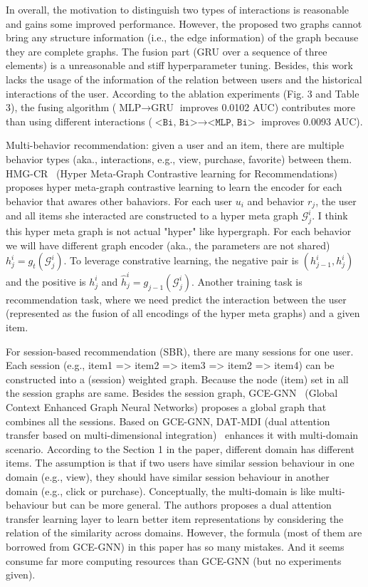 In overall, the motivation to distinguish two types of interactions is reasonable and gains some improved performance.
However, the proposed two graphs cannot bring any structure information (i.e., the edge information) of the graph because they are complete graphs.
The fusion part (GRU over a sequence of three elements) is a unreasonable and stiff hyperparameter tuning.
Besides, this work lacks the usage of the information of the relation between users and the historical interactions of the user.
According to the ablation experiments (Fig. 3 and Table 3), the fusing algorithm ($\text{MLP} \rightarrow \text{GRU}$ improves 0.0102 AUC) contributes more than using different interactions ($\texttt{<Bi, Bi>} \rightarrow \texttt{<MLP, Bi>}$ improves 0.0093 AUC).

Multi-behavior recommendation: given a user and an item, there are multiple behavior types (aka., interactions, e.g., view, purchase, favorite) between them.
HMG-CR~ (Hyper Meta-Graph Contrastive learning for Recommendations) proposes hyper meta-graph contrastive learning to learn the encoder for each behavior that awares other bahaviors.
For each user $u_i$ and behavior $r_j$, the user and all items she interacted are constructed to a hyper meta graph $\mathcal{G}_j^i$.
I think this hyper meta graph is not actual "hyper" like hypergraph.
For each behavior we will have different graph encoder (aka., the parameters are not shared) $h_j^i = g_t (\mathcal{G}_j^i)$.
To leverage constrative learning, the negative pair is $(h_{j-1}^i, h_j^i)$ and the positive is $h_j^i$ and $\hat{h}^i_j = g_{j-1} (\mathcal{G}_j^i)$.
Another training task is recommendation task, where we need predict the interaction between the user (represented as the fusion of all encodings of the hyper meta graphs) and a given item.

For session-based recommendation (SBR), there are many sessions for one user.
Each session (e.g., item1 => item2 => item3 => item2 => item4) can be constructed into a (session) weighted graph.
Because the node (item) set in all the session graphs are same.
Besides the session graph, GCE-GNN~ (Global Context Enhanced Graph Neural Networks) proposes a global graph that combines all the sessions.
Based on GCE-GNN, DAT-MDI (dual attention transfer based on multi-dimensional integration)~ enhances it with multi-domain scenario.
According to the Section 1 in the paper, different domain has different items.
The assumption is that if two users have similar session behaviour in one domain (e.g., view), they should have similar session behaviour in another domain (e.g., click or purchase).
Conceptually, the multi-domain is like multi-behaviour but can be more general.
The authors proposes a dual attention transfer learning layer to learn better item representations by considering the relation of the similarity across domains.
However, the formula (most of them are borrowed from GCE-GNN) in this paper has so many mistakes.
And it seems consume far more computing resources than GCE-GNN (but no experiments given).

